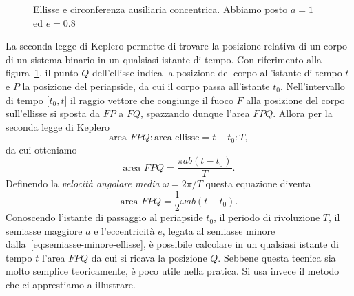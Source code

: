 \begin{figure}
  \centering
  \caption[Ellisse e circonferenza ausiliaria per l'equazione di
  Keplero]{Ellisse e circonferenza ausiliaria concentrica. Abbiamo posto $a=1$
    ed $e=0.8$}
  \label{fig:circonferenza-ausiliaria-keplero}
\end{figure}
La seconda legge di Keplero permette di trovare la posizione relativa di un
corpo di un sistema binario in un qualsiasi istante di tempo. Con riferimento
alla figura~\ref{fig:circonferenza-ausiliaria-keplero}, il punto $Q$
dell'ellisse indica la posizione del corpo all'istante di tempo $t$ e $P$ la
posizione del periapside, da cui il corpo passa all'istante
$t_0$. Nell'intervallo di tempo $\mathopen{[}t_0, t\mathclose{]}$ il raggio
vettore che congiunge il fuoco $F$ alla posizione del corpo sull'ellisse si
sposta da $FP$ a $FQ$, spazzando dunque l'area $FPQ$. Allora per la seconda
legge di Keplero
\begin{equation}
  \text{area } FPQ : \text{area ellisse} = t-t_0 : T,
\end{equation}
da cui otteniamo
\begin{equation}
  \text{area } FPQ = \frac{\pi ab(t-t_0)}{T}.
\end{equation}
Definendo la \emph{velocità angolare media} $\omega = 2\pi/T$ questa equazione
diventa
\begin{equation}
  \text{area } FPQ = \frac{1}{2}\omega ab(t-t_0).
\end{equation}
Conoscendo l'istante di passaggio al periapside $t_0$, il periodo di rivoluzione
$T$, il semiasse maggiore $a$ e l'eccentricità $e$, legata al semiasse minore
dalla~\eqref{eq:semiasse-minore-ellisse}, è possibile calcolare in un qualsiasi
istante di tempo $t$ l'area $FPQ$ da cui si ricava la posizione $Q$. Sebbene
questa tecnica sia molto semplice teoricamente, è poco utile nella pratica. Si
usa invece il metodo che ci apprestiamo a illustrare.

